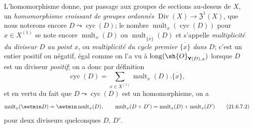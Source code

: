 \begin{env}[21.6.7]
L'homomorphisme  donne, par passage aux groupes de sections au-dessus de $X$, un \emph{homomorphisme croissant de groupes ordonnés} $\operatorname{Div}(X)\to\mathfrak{Z}^1(X)$, que nous noterons encore $D\leadsto\operatorname{cyc}(D)$;
le nombre $\operatorname{mult}_x(\operatorname{cyc}(D))$ pour $x\in X^{(1)}$ se note encore $\operatorname{mult}_x(D)$ ou $\operatorname{mult}_{\overline{\{x\}}}(D)$ et s'appelle \emph{multiplicité du diviseur $D$ au point $x$}, ou \emph{multiplicité du cycle premier $\overline{\{x\}}$ dans $D$};
c'est un entier positif ou négatif, égal comme on l'a vu à $\operatorname{long}(\sh{O}_{\boldsymbol{\mathsf{Y}}(D),x})$ lorsque $D$ est un diviseur \emph{positif};
on a donc par définition
\[
\label{IV.21.6.7.1}
  \operatorname{cyc}(D)=\sum_{x\in X^{(1)}}\operatorname{mult}_x(D).\overline{\{x\}},
  \tag{21.6.7.1}
\]
et en vertu du fait que $D\leadsto\operatorname{cyc}(D)$ est un homomorphisme, on a
\[
\label{IV.21.6.7.2}
  \operatorname{mult}_x(\setmin D)=\setmin\operatorname{mult}_x(D),\qquad
  \operatorname{mult}_x(D+D')=\operatorname{mult}_x(D)+\operatorname{mult}_x(D')
  \tag{21.6.7.2}
\]
pour deux diviseurs quelconques $D$, $D'$.


\end{env}
